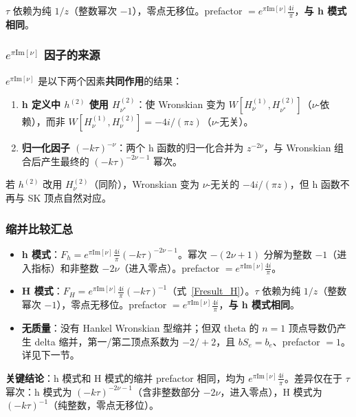 ﻿\documentclass[a4paper,11pt]{article}
\begin{document}
$\tau$ 依赖为纯 $1/z$（整数幂次 $-1$），零点无移位。prefactor $= e^{\pi\text{Im}[\nu]} \frac{4i}{\pi}$，\textbf{与 h 模式相同}。

\subsubsection{$e^{\pi\text{Im}[\nu]}$ 因子的来源}

$e^{\pi\text{Im}[\nu]}$ 是以下两个因素\textbf{共同作用}的结果：

\begin{enumerate}
  \item \textbf{h 定义中 $h^{(2)}$ 使用 $H_{\nu^*}^{(2)}$}：使 Wronskian 变为 $W[H_\nu^{(1)}, H_{\nu^*}^{(2)}]$（$\nu$-依赖），而非 $W[H_\nu^{(1)}, H_\nu^{(2)}] = -4i/(\pi z)$（$\nu$-无关）。
  \item \textbf{归一化因子 $(-k\tau)^{-\nu}$}：两个 h 函数的归一化合并为 $z^{-2\nu}$，与 Wronskian 组合后产生最终的 $(-k\tau)^{-2\nu-1}$ 幂次。
\end{enumerate}

若 $h^{(2)}$ 改用 $H_\nu^{(2)}$（同阶），Wronskian 变为 $\nu$-无关的 $-4i/(\pi z)$，但 h 函数不再与 SK 顶点自然对应。

\subsubsection{缩并比较汇总}

\begin{itemize}
  \item \textbf{h 模式}：$F_h = e^{\pi\text{Im}[\nu]} \frac{4i}{\pi} (-k\tau)^{-2\nu-1}$。幂次 $-(2\nu+1)$ 分解为整数 $-1$（进入指标）和非整数 $-2\nu$（进入零点）。prefactor $= e^{\pi\text{Im}[\nu]} \frac{4i}{\pi}$。
  \item \textbf{H 模式}：$F_H = e^{\pi\text{Im}[\nu]} \frac{4i}{\pi} (-k\tau)^{-1}$（式~\eqref{Fresult_H}）。$\tau$ 依赖为纯 $1/z$（整数幂次 $-1$），零点无移位。prefactor $= e^{\pi\text{Im}[\nu]} \frac{4i}{\pi}$，\textbf{与 h 模式相同}。
  \item \textbf{无质量}：没有 Hankel Wronskian 型缩并；但双 theta 的 $n=1$ 顶点导数仍产生 delta 缩并，第一/第二顶点系数为 $-2/+2$，且 $bS_e=b_e$、prefactor $=1$。详见下一节。
\end{itemize}

\textbf{关键结论}：h 模式和 H 模式的缩并 prefactor 相同，均为 $e^{\pi\text{Im}[\nu]} \frac{4i}{\pi}$。差异仅在于 $\tau$ 幂次：h 模式为 $(-k\tau)^{-2\nu-1}$（含非整数部分 $-2\nu$，进入零点），H 模式为 $(-k\tau)^{-1}$（纯整数，零点无移位）。
\end{document}
